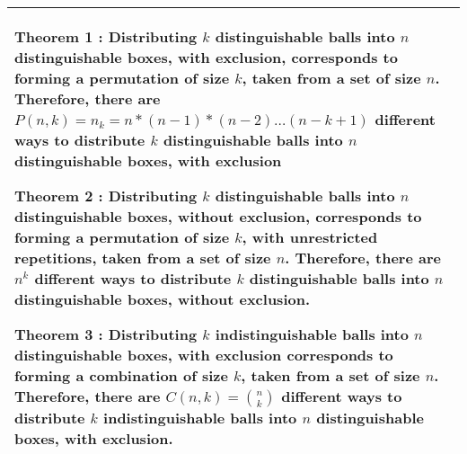 {\tabulinesep=1mm
\begin{tabu}{|p{16cm} |}
\hline
\vspace{2 mm}
\textbf{Theorem 1} : Distributing $k$ distinguishable balls into $n$ 
distinguishable boxes, with exclusion, corresponds to forming a 
permutation of size $k$, taken from a set of size $n$. Therefore, 
there are $P(n, k)  = n_k  = n*(n - 1)*(n - 2) \dotsc (n - k+1)$ 
different ways to distribute $k$ distinguishable balls into $n$ 
distinguishable boxes, with exclusion  \vspace{5 mm}

\textbf{Theorem 2} : Distributing $k$ distinguishable balls into $n$ 
distinguishable boxes, without exclusion, corresponds to forming a 
permutation of size $k$, with unrestricted repetitions, taken from a 
set of size $n$. Therefore, there are $n^k$ different ways to 
distribute $k$ distinguishable balls into $n$ distinguishable boxes, 
without exclusion.\vspace{5 mm}

\textbf{Theorem 3} : Distributing $k$ indistinguishable balls into 
$n$ distinguishable boxes, with exclusion corresponds to forming a 
combination of size $k$, taken from a set of size $n$. Therefore, 
there are $C(n, k) =  { n \choose k}$ different ways to distribute 
$k$ indistinguishable balls into $n$ distinguishable boxes, with 
exclusion. \vspace{5 mm}
\\
\hline
\end{tabu}
}